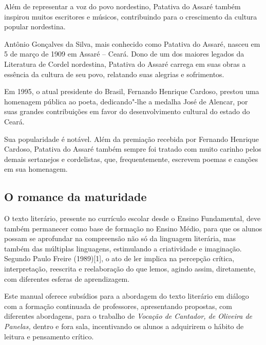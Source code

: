 \documentclass[12pt]{extarticle}
\begin{document}
{Além de representar a voz do povo nordestino, Patativa do Assaré também
inspirou muitos escritores e músicos, contribuindo para o crescimento da
cultura popular nordestina.

Antônio Gonçalves da Silva, mais conhecido como Patativa do Assaré,
nasceu em 5 de março de 1909 em Assaré -- Ceará. Dono de um dos maiores
legados da Literatura de Cordel nordestina, Patativa do Assaré carrega
em suas obras a essência da cultura de seu povo, relatando suas alegrias
e sofrimentos.


Em 1995, o atual presidente do Brasil, Fernando Henrique Cardoso,
prestou uma homenagem pública ao poeta, dedicando"-lhe a medalha José de
Alencar, por suas grandes contribuições em favor do desenvolvimento
cultural do estado do Ceará.

Sua popularidade é notável. Além da premiação recebida por Fernando
Henrique Cardoso, Patativa do Assaré também sempre foi tratado com muito
carinho pelos demais sertanejos e cordelistas, que, frequentemente,
escrevem poemas e canções em sua homenagem.



\subsection{O romance da maturidade}

O texto literário, presente no currículo escolar desde o Ensino
Fundamental, deve também permanecer como base de formação no Ensino
Médio, para que os alunos possam se aprofundar na compreensão não só da
linguagem literária, mas também das múltiplas linguagens, estimulando a
criatividade e imaginação. Segundo Paulo Freire (1989){[}1{]}, o ato de
ler implica na percepção crítica, interpretação, reescrita e
reelaboração do que lemos, agindo assim, diretamente, com diferentes
esferas de aprendizagem.

Este manual oferece subsídios para a abordagem do texto literário em
diálogo com a formação continuada de professores, apresentando
propostas, com diferentes abordagens, para o trabalho de \emph{Vocação
de Cantador, de Oliveira de Panelas,} dentro e fora sala, incentivando
os alunos a adquirirem o hábito de leitura e pensamento crítico.

}
\end{document}
